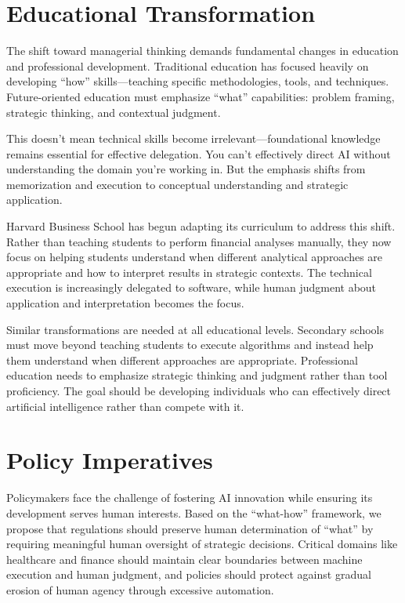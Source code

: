 \documentclass[
  Letterpaper,
]{scrbook}
\begin{document}
\section{Educational Transformation}\label{educational-transformation}

The shift toward managerial thinking demands fundamental changes in
education and professional development. Traditional education has
focused heavily on developing ``how'' skills---teaching specific
methodologies, tools, and techniques. Future-oriented education must
emphasize ``what'' capabilities: problem framing, strategic thinking,
and contextual judgment.

This doesn't mean technical skills become irrelevant---foundational
knowledge remains essential for effective delegation. You can't
effectively direct AI without understanding the domain you're working
in. But the emphasis shifts from memorization and execution to
conceptual understanding and strategic application.

Harvard Business School has begun adapting its curriculum to address
this shift. Rather than teaching students to perform financial analyses
manually, they now focus on helping students understand when different
analytical approaches are appropriate and how to interpret results in
strategic contexts. The technical execution is increasingly delegated to
software, while human judgment about application and interpretation
becomes the focus.

Similar transformations are needed at all educational levels. Secondary
schools must move beyond teaching students to execute algorithms and
instead help them understand when different approaches are appropriate.
Professional education needs to emphasize strategic thinking and
judgment rather than tool proficiency. The goal should be developing
individuals who can effectively direct artificial intelligence rather
than compete with it.

\section{Policy Imperatives}\label{policy-imperatives}

Policymakers face the challenge of fostering AI innovation while
ensuring its development serves human interests. Based on the
``what-how'' framework, we propose that regulations should preserve
human determination of ``what'' by requiring meaningful human oversight
of strategic decisions. Critical domains like healthcare and finance
should maintain clear boundaries between machine execution and human
judgment, and policies should protect against gradual erosion of human
agency through excessive automation.
\end{document}
